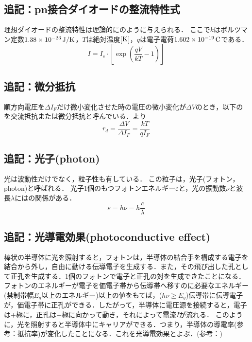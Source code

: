 \subsection{追記：pn接合ダイオードの整流特性式\cite{jsdfvl}\cite{113000079590612}}
理想ダイオードの整流特性は理論的にのように与えられる．
ここで$k$はボルツマン定数$1.38\times 10^{-23}\,\rm{J/K}$，$T$は絶対温度[$\rm{K}$]，$q$は電子電荷$1.602\times 10^{-19}\,\rm{C}$である．
\begin{equation}
I=I_{s} \cdot \left[\exp \left(\frac{qV}{kT}-1\right)\right ]
\label{eq:exp}
\end{equation}

\subsection{追記：微分抵抗\cite{113000079590612}}
順方向電圧を$\Delta I_{F}$だけ微小変化させた時の電圧の微小変化が$\Delta V$のとき，以下のを交流抵抗または微分抵抗と呼んでいる．より
\begin{equation}
r_{d}=\frac{\Delta V}{\Delta I_{F}}=\frac{kT}{qI_{F}}
\label{eq:diff}
\end{equation}

\subsection{追記：光子(photon)\cite{1130003902054832640}}
光は波動性だけでなく，粒子性も有している．
この粒子は，光子(フォトン，photon)と呼ばれる．
光子1個のもつフォトンエネルギー$\varepsilon$と，光の振動数$\nu$と波長$\lambda$にはの関係がある．
\begin{equation}
	\varepsilon = h \nu =h\frac{c}{\lambda}
	\label{eq:epsion}
\end{equation}

\subsection{追記：光導電効果(photoconductive effect)\cite{11300039054832640}}
棒状の半導体に光を照射すると，フォトンは，半導体の結合手を構成する電子を結合から外し，自由に動ける伝導電子を生成する．また，その飛び出した孔として正孔を生成する．1個のフォトンで電子と正孔の対を生成できたことになる．
フォトンのエネルギーが電子を価電子帯から伝導帯へ移すのに必要なエネルギー(禁制帯幅$E_{g}$以上のエネルギー)以上の値をもてば，($h\nu \geq E_{g}$)伝導帯に伝導電子が，価電子帯に正孔ができる．したがって，半導体に電圧源を接続すると，電子は$+$極に，正孔は$-$極に向かって動き，それによって電流$I$が流れる．
このように，光を照射すると半導体中にキャリアができる．つまり，半導体の導電率(参考：抵抗率)が変化したことになる．これを光導電効果とよぶ．(参考：)

